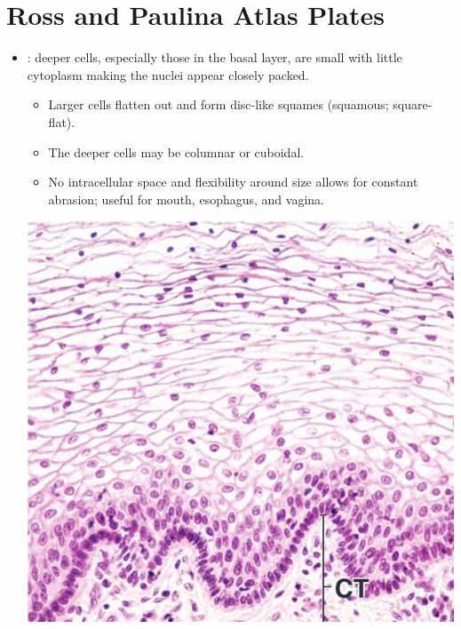 \section{Ross and Paulina Atlas Plates}\label{Ross and Paulina Atlas Plates}
\begin{itemize}
  \item {}: deeper cells, especially those in the basal layer, are small with little cytoplasm making the nuclei appear closely packed.
    \begin{itemize}
      \item Larger cells flatten out and form disc-like squames (squamous; square-flat).
      \item The deeper cells may be columnar or cuboidal.
      \item No intracellular space and flexibility around size allows for constant abrasion; useful for mouth, esophagus, and vagina. 
    \end{itemize}
  \begin{center}
    \includegraphics[scale=0.375]{images/week-1-rp1.jpg}

\end{center}
\end{itemize}
